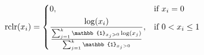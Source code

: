 \documentclass{article}
\begin{document}
\begin{equation}
 \text{rclr}(x_i) =   \begin{dcases*}
      0, & if $ x_i=0$ \\
      \frac{\log(x_i)}{\frac{\sum_{j=1}^k \mathbb{1}_{x_j>0} \log(x_j) }{\sum_{j=1}^k \mathbb{1}_{x_j>0}}}, & if  $0 < x_i \leq 1$
    \end{dcases*}
    \end{equation}
\end{document}
